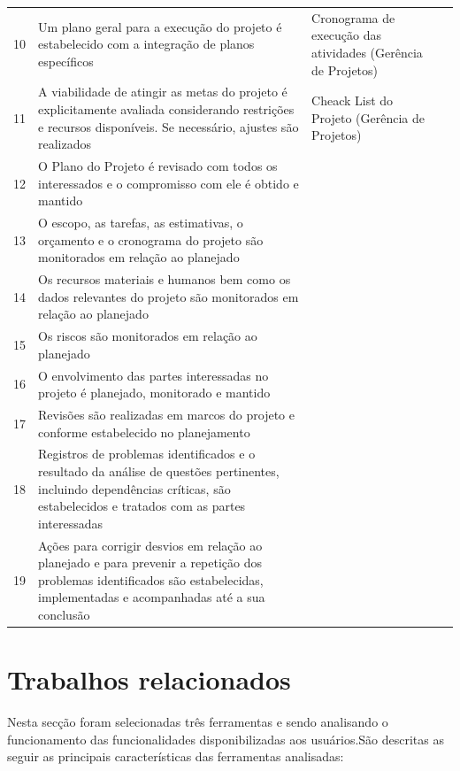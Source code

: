 \documentclass{acm_proc_article-sp}
\begin{document}
\begin{table}[h]
\begin{tabular}{|p{10mm}|p{60mm}|p{60mm}|p{25mm}|}
10 & Um plano geral para a execução do projeto é estabelecido com a integração de planos específicos & Cronograma de execução das atividades (Gerência de Projetos) & \\
11 & A viabilidade de atingir as metas do projeto é explicitamente avaliada considerando restrições e recursos disponíveis. Se necessário, ajustes são realizados & Cheack List do Projeto (Gerência de Projetos) & \\
12 & O Plano do Projeto é revisado com todos os interessados e o compromisso com ele é obtido e mantido & &\\
13 & O escopo, as tarefas, as estimativas, o orçamento e o cronograma do projeto são monitorados em relação ao planejado & &\\
14 & Os recursos materiais e humanos bem como os dados relevantes do projeto são monitorados em relação ao planejado & & \\
15 & Os riscos são monitorados em relação ao planejado & & \\
16 & O envolvimento das partes interessadas no projeto é planejado, monitorado e mantido & & \\
17 & Revisões são realizadas em marcos do projeto e conforme estabelecido no planejamento & & \\
18 & Registros de problemas identificados e o resultado da análise de questões pertinentes, incluindo dependências críticas, são
estabelecidos e tratados com as partes interessadas & & \\
19 & Ações para corrigir desvios em relação ao planejado e para prevenir a repetição dos problemas identificados são estabelecidas, implementadas e acompanhadas até a sua conclusão & & \\
\hline


\hline
\end{tabular}
\end{table}

\section{Trabalhos relacionados}
Nesta secção foram selecionadas três ferramentas e sendo analisando o funcionamento das funcionalidades disponibilizadas aos usuários.São descritas as seguir as principais características das ferramentas analisadas:
\end{document}
